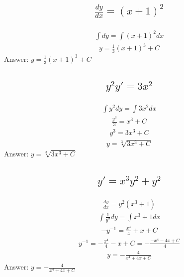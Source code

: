 \documentclass{article}
\begin{document}
\subsection{
	\begin{align*}
		\frac{dy}{dx} = (x + 1)^2
	\end{align*}
}
\begin{align*}
	\int dy = \int{(x + 1)^2}dx
\end{align*}
\begin{align*}
	y = \frac{1}{3} (x + 1)^3 + C
\end{align*}
Answer: $y = \frac{1}{3} (x + 1)^3 + C$

\subsection{
	\begin{align*}
		y^2 y' = 3x^2
	\end{align*}
}
\begin{align*}
	\int {y^2}dy = \int {3x^2}dx
\end{align*}
\begin{align*}
	\frac{y^3}{3} = x^3 + C
\end{align*}
\begin{align*}
	y^3 = 3x^3 + C
\end{align*}
\begin{align*}
	y = \sqrt[3]{3x^3 + C}
\end{align*}
Answer: $y = \sqrt[3]{3x^3 + C}$

\subsection{
	\begin{align*}
		y' = x^3y^2 + y^2
	\end{align*}
}
\begin{align*}
	\frac{dy}{dx} = y^2(x^3 + 1)
\end{align*}
\begin{align*}
	\int {\frac{1}{y^2}}dy = \int {x^3 + 1}dx
\end{align*}
\begin{align*}
	-y^{-1} = \frac{x^4}{4} + x + C
\end{align*}
\begin{align*}
	y^{-1} = -\frac{x^4}{4} - x + C = -\frac{-x^4 - 4x + C}{4}
\end{align*}
\begin{align*}
	y = -\frac{4}{x^4 + 4x + C}
\end{align*}
Answer: $y = -\frac{4}{x^4 + 4x + C}$
\end{document}
